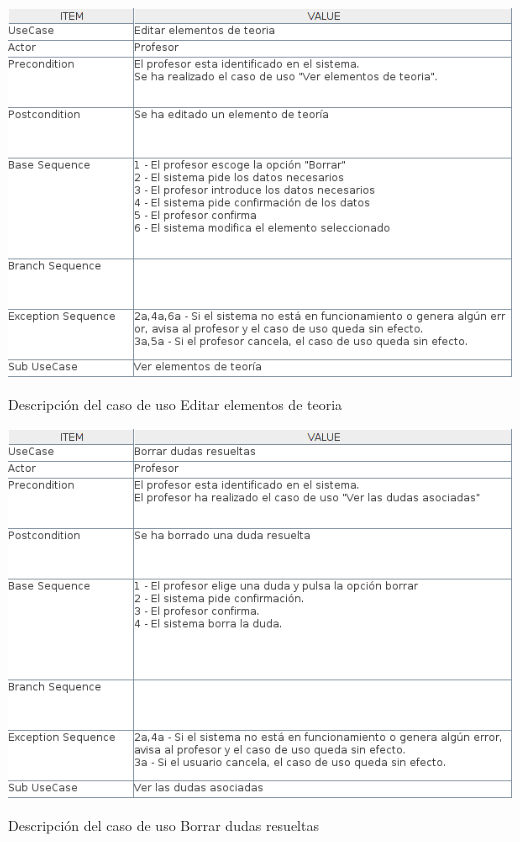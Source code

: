 \documentclass[openright,twoside,10pt]{book}
\begin{document}
    \vspace*{\fill}
    
    \newpage
    
    \vspace*{\fill}
    
    \begin{table}[H]
        \begin{center}
            \includegraphics[width=\textwidth]{img/astah/analisis/casos_de_uso/useCase15.png}
        \end{center}
        \caption{Descripción del caso de uso Editar elementos de teoria}
    \end{table}
    
    \vspace*{\fill}
    
    \newpage
    
    \vspace*{\fill}
    
    \begin{table}[H]
        \begin{center}
            \includegraphics[width=\textwidth]{img/astah/analisis/casos_de_uso/useCase16.png}
        \end{center}
        \caption{Descripción del caso de uso Borrar dudas resueltas}
    \end{table}
    
\end{document}
